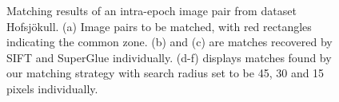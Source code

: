 \begin{figure}[htbp]
\begin{center}
{\begin{minipage}[t]{0.48\linewidth}
			\end{minipage}%
		}
		\caption{Matching results of an intra-epoch image pair from dataset Hofsjökull. (a) Image pairs to be matched, with red rectangles indicating the common zone. (b) and (c) are matches recovered by SIFT and SuperGlue individually. (d-f) displays matches found by our matching strategy with search radius set to be 45, 30 and 15 pixels individually.}
		\label{Matchresult}
	\end{center}
\end{figure} 

